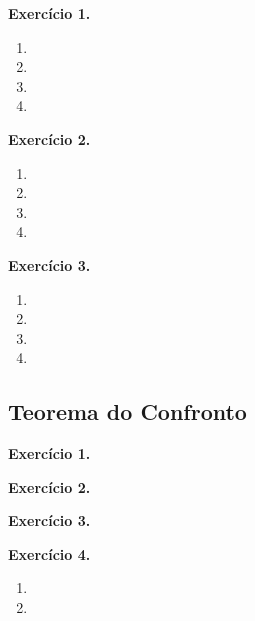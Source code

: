 \documentclass[12pt,a4paper]{article}
\begin{document}
\vspace{0.5cm}
\noindent\textbf{Exercício 1.}
\begin{enumerate}
    \renewcommand{\theenumi}{\alph{enumi}}
    \renewcommand{\labelenumi}{\theenumi)}
    \item 
    \item 
    \item 
    \item 
\end{enumerate}

\vspace{0.5cm}
\noindent\textbf{Exercício 2.}
\begin{enumerate}
    \renewcommand{\theenumi}{\alph{enumi}}
    \renewcommand{\labelenumi}{\theenumi)}
    \item 
    \item 
    \item 
    \item 
\end{enumerate}

\vspace{0.5cm}
\noindent\textbf{Exercício 3.}
\begin{enumerate}
    \renewcommand{\theenumi}{\alph{enumi}}
    \renewcommand{\labelenumi}{\theenumi)}
    \item 
    \item 
    \item 
    \item 
\end{enumerate}

\subsection{Teorema do Confronto}

\vspace{0.5cm}
\noindent\textbf{Exercício 1.}

\vspace{0.5cm}
\noindent\textbf{Exercício 2.}

\vspace{0.5cm}
\noindent\textbf{Exercício 3.}

\vspace{0.5cm}
\noindent\textbf{Exercício 4.}
\begin{enumerate}
    \renewcommand{\theenumi}{\alph{enumi}}
    \renewcommand{\labelenumi}{\theenumi)}
    \item 
    \item 
\end{enumerate}
\end{document}
